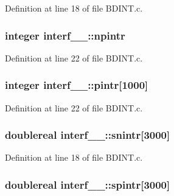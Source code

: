 Definition at line 18 of file B\+D\+I\+N\+T.\+c.

\subsubsection[{\texorpdfstring{npintr}{npintr}}]{\setlength{\rightskip}{0pt plus 5cm}integer interf\+\_\+\_\+\+::npintr}\hypertarget{structinterf__1___a66c11d93cf0173208c66cae678a6b948}{}\label{structinterf__1___a66c11d93cf0173208c66cae678a6b948}


Definition at line 22 of file B\+D\+I\+N\+T.\+c.

\subsubsection[{\texorpdfstring{pintr}{pintr}}]{\setlength{\rightskip}{0pt plus 5cm}integer interf\+\_\+\_\+\+::pintr\mbox{[}1000\mbox{]}}\hypertarget{structinterf__1___ab975e100c5c471eab953f800bcb88a95}{}\label{structinterf__1___ab975e100c5c471eab953f800bcb88a95}


Definition at line 22 of file B\+D\+I\+N\+T.\+c.

\subsubsection[{\texorpdfstring{snintr}{snintr}}]{\setlength{\rightskip}{0pt plus 5cm}doublereal interf\+\_\+\_\+\+::snintr\mbox{[}3000\mbox{]}}\hypertarget{structinterf__1___a9acfb561f17d6843f01550b17486e5c3}{}\label{structinterf__1___a9acfb561f17d6843f01550b17486e5c3}


Definition at line 18 of file B\+D\+I\+N\+T.\+c.

\subsubsection[{\texorpdfstring{spintr}{spintr}}]{\setlength{\rightskip}{0pt plus 5cm}doublereal interf\+\_\+\_\+\+::spintr\mbox{[}3000\mbox{]}}\hypertarget{structinterf__1___aede0bcb6b94433e9eda17d0c8a4d87e4}{}\label{structinterf__1___aede0bcb6b94433e9eda17d0c8a4d87e4}


